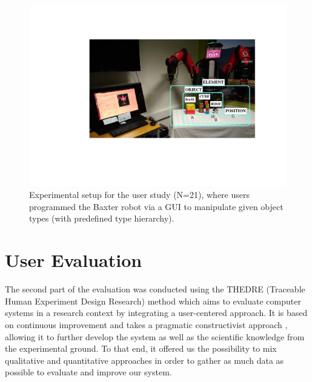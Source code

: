 
\begin{figure}[t]
	\centering
	\includegraphics[width=0.7\linewidth]{figures/dispositif.pdf}
	\caption{Experimental setup for the user study (N=21), where users programmed the Baxter robot via a GUI to manipulate given object types (with predefined type hierarchy). }
	\label{fig:dispositif}
\end{figure}

\section{User Evaluation}
\label{sec:quanteval}
The second part of the evaluation was conducted using the THEDRE (Traceable Human Experiment Design Research) method \cite{mandran2018traceable,mandran2017thedre} which aims to evaluate computer systems in a research context by integrating a user-centered approach.
It is based on continuous improvement and takes a pragmatic constructivist approach \cite{avenier2015finding}, allowing it to further develop the system as well as the scientific knowledge from the experimental ground.
To that end, it offered us the possibility to mix qualitative and quantitative approaches in order to gather as much data as possible to evaluate and improve our system. 

